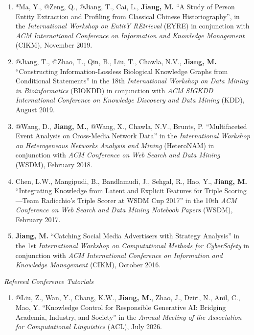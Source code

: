 \documentclass[10pt]{article}
\newenvironment{myindentpar}[1]%
{\begin{list}{}%
         {\setlength{\leftmargin}{#1}}%
         \item[]%
}
{\end{list}}
\newcounter{list}
\begin{document}
\begin{myindentpar}{0.00cm}
\begin{enumerate}[leftmargin=.5cm]
\item[W5] *Ma, Y., @Zeng, Q., @Jiang, T., Cai, L., \textbf{Jiang, M.} ``A Study of Person Entity Extraction and Profiling from Classical Chinese Historiography'', in the \textit{International Workshop on EntitY REtrieval} (EYRE) in conjunction with \textit{ACM International Conference on Information and Knowledge Management} (CIKM), November 2019.

\item[W4] @Jiang, T., @Zhao, T., Qin, B., Liu, T., Chawla, N.V., \textbf{Jiang, M.} ``Constructing Information-Lossless Biological Knowledge Graphs from Conditional Statements'' in the 18th \textit{International Workshop on Data Mining in Bioinformatics} (BIOKDD) in conjunction with \textit{ACM SIGKDD International Conference on Knowledge Discovery and Data Mining} (KDD), August 2019.

\item[W3] @Wang, D., \textbf{Jiang, M.}, @Wang, X., Chawla, N.V., Brunts, P. ``Multifaceted Event Analysis on Cross-Media Network Data'' in the \textit{International Workshop on Heterogeneous Networks Analysis and Mining} (HeteroNAM) in conjunction with \textit{ACM Conference on Web Search and Data Mining} (WSDM), February 2018.

\item[W2] Chen, L.W., Mangipudi, B., Bandlamudi, J., Sehgal, R., Hao, Y., \textbf{Jiang, M.} ``Integrating Knowledge from Latent and Explicit Features for Triple Scoring—Team Radicchio's Triple Scorer at WSDM Cup 2017'' in the 10th \textit{ACM Conference on Web Search and Data Mining Notebook Papers} (WSDM), February 2017.

\item[W1] \textbf{Jiang, M.} ``Catching Social Media Advertisers with Strategy Analysis'' in the 1st \textit{International Workshop on Computational Methods for CyberSafety} in conjunction with \textit{ACM International Conference on Information and Knowledge Management} (CIKM), October 2016.

\end{enumerate}

\hspace{-0.25cm}\textit{Refereed Conference Tutorials}

\begin{enumerate}[leftmargin=.5cm]

\item[T16] @Liu, Z., Wan, Y., Chang, K.W., \textbf{Jiang, M.}, Zhao, J., Dziri, N., Anil, C., Mao, Y. ``Knowledge Control for Responsible Generative AI: Bridging Academia, Industry, and Society'' in the \textit{Annual Meeting of the Association for Computational Linguistics} (ACL), July 2026.


\end{enumerate}
\end{myindentpar}
\end{document}
